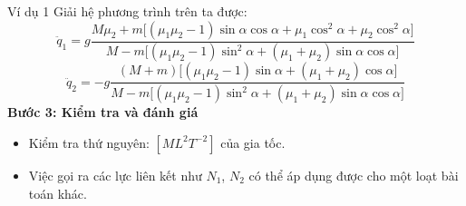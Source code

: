 \begin{frame}{Ví dụ 1}
    Giải hệ phương trình trên ta được:
    \begin{equation*}
    \ddot q_1 =g
\frac{
M\mu_2
+m\Big[(\mu_1 \mu_2 -1)\sin\alpha\cos\alpha
+\mu_1\cos^2\alpha
+\mu_2\cos^2\alpha
\Big]
}
{M - m\Big[(\mu_1\mu_2 -1)\sin^2\alpha
+(\mu_1+\mu_2)\sin\alpha\cos\alpha
\Big]}
    \end{equation*}
    \begin{equation*}
        \ddot q_2 =
-g\frac{(M+m)\Big[
(\mu_1\mu_2 -1)\sin\alpha
+(\mu_1 +\mu_2)\cos\alpha
\Big]}
{M - m\Big[(\mu_1\mu_2 -1)\sin^2\alpha
+(\mu_1+\mu_2)\sin\alpha\cos\alpha
\Big]}
    \end{equation*}
\textbf{Bước 3: Kiểm tra và đánh giá}
\begin{itemize}
    \item Kiểm tra thứ nguyên: \([ML^2T^{-2}]\) của gia tốc.
    \item Việc gọi ra các lực liên kết như \(N_1\), \(N_2\) có thể áp dụng được cho một loạt bài toán khác.
\end{itemize}
\end{frame}